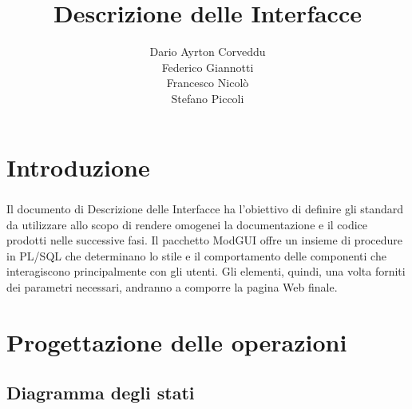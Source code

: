 \documentclass[a4paper, 12pt]{report}
\begin{document}
\title{Descrizione delle Interfacce}\author{Dario Ayrton Corveddu\\Federico Giannotti\\Francesco Nicolò\\Stefano Piccoli}
\maketitle
\tableofcontents
	\chapter*{Introduzione}
        \paragraph{}Il documento di Descrizione delle Interfacce ha l'obiettivo di definire gli standard da utilizzare allo 
        scopo di rendere omogenei la documentazione e il codice prodotti nelle successive fasi.
        Il pacchetto ModGUI offre un insieme di procedure in PL/SQL che determinano lo stile e il comportamento
        delle componenti che interagiscono principalmente con gli utenti. Gli elementi, quindi, una volta forniti dei 
        parametri necessari, andranno a comporre la pagina Web finale.

    \chapter{Progettazione delle operazioni}
        \section{Diagramma degli stati}
\end{document}
